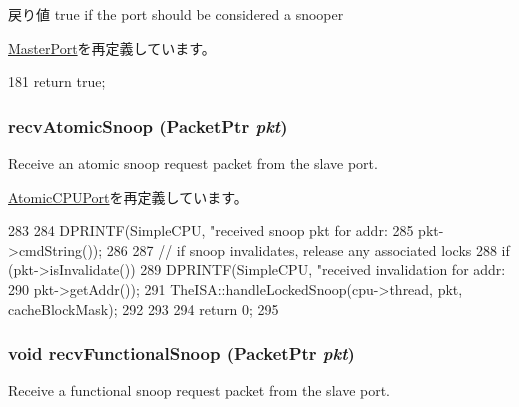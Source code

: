 \begin{DoxyReturn}{戻り値}
true if the port should be considered a snooper 
\end{DoxyReturn}


\hyperlink{classMasterPort_a32602a6a3c3d66a639455036d6c08dd6}{MasterPort}を再定義しています。


\begin{DoxyCode}
181 { return true; }
\end{DoxyCode}
\hypertarget{classAtomicSimpleCPU_1_1AtomicCPUDPort_a886d584c81ee4e398ff8069907f6e1a5}{
\subsubsection[{recvAtomicSnoop}]{ recvAtomicSnoop ({\bf PacketPtr} {\em pkt})}}
\label{classAtomicSimpleCPU_1_1AtomicCPUDPort_a886d584c81ee4e398ff8069907f6e1a5}
Receive an atomic snoop request packet from the slave port. 

\hyperlink{classAtomicSimpleCPU_1_1AtomicCPUPort_ae1160d8f94f042aba1dc9a07a72e1e82}{AtomicCPUPort}を再定義しています。


\begin{DoxyCode}
283 {
284     DPRINTF(SimpleCPU, "received snoop pkt for addr:%
285             pkt->cmdString());
286 
287     // if snoop invalidates, release any associated locks
288     if (pkt->isInvalidate()) {
289         DPRINTF(SimpleCPU, "received invalidation for addr:%
290                 pkt->getAddr());
291         TheISA::handleLockedSnoop(cpu->thread, pkt, cacheBlockMask);
292     }
293 
294     return 0;
295 }
\end{DoxyCode}
\hypertarget{classAtomicSimpleCPU_1_1AtomicCPUDPort_a284dfb90c168233c9d416bc07de8fefe}{
\subsubsection[{recvFunctionalSnoop}]{\setlength{\rightskip}{0pt plus 5cm}void recvFunctionalSnoop ({\bf PacketPtr} {\em pkt})}}
\label{classAtomicSimpleCPU_1_1AtomicCPUDPort_a284dfb90c168233c9d416bc07de8fefe}
Receive a functional snoop request packet from the slave port. 

